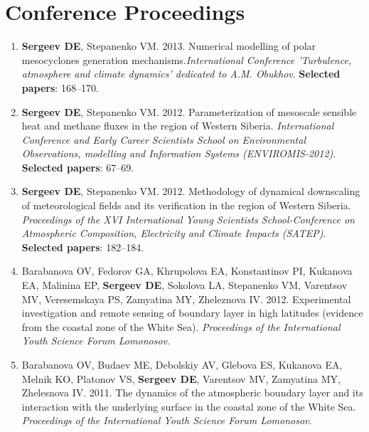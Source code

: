 \documentclass[a4paper,11pt]{article}
\makeatletter
\newlength{\bibhang}
\newlength{\bibsep}
 {\@listi \global\bibsep\itemsep \global\advance\bibsep by\parsep}
\newenvironment{bibsection}%
        {\begin{enumerate}{}{%
       \setlength{\leftmargin}{\bibhang}%
       \setlength{\itemindent}{-\leftmargin}%
       \setlength{\itemsep}{\bibsep}%
       \setlength{\parsep}{\z@}%
        \setlength{\partopsep}{0pt}%
        \setlength{\topsep}{0pt}}}
        {\end{enumerate}\vspace{-.6\baselineskip}}
\makeatother
\begin{document}
\section{Conference Proceedings}
\begin{bibsection}
    \item {\bf Sergeev DE}, Stepanenko VM. 2013. Numerical modelling of polar mesocyclones generation mechanisms.\emph{International Conference 'Turbulence, atmosphere and climate dynamics' dedicated to A.M. Obukhov}. {\bf Selected papers}: 168--170.
    \item {\bf Sergeev DE}, Stepanenko VM. 2012. Parameterization of mesoscale sensible heat and methane fluxes in the region of Western Siberia. \emph{International Conference and Early Career Scientists School on Environmental Observations, modelling and Information Systems (ENVIROMIS-2012)}. {\bf Selected papers}: 67--69.
    \item {\bf Sergeev DE}, Stepanenko VM. 2012. Methodology of dynamical downscaling of meteorological fields and its verification in the region of Western Siberia. \emph{Proceedings of the XVI International Young Scientists School-Conference on Atmospheric Composition, Electricity and Climate Impacts (SATEP)}. {\bf Selected papers}: 182--184.
    \item Barabanova OV, Fedorov GA, Khrupolova EA, Konstantinov PI, Kukanova EA, Malinina EP, {\bf Sergeev DE}, Sokolova LA, Stepanenko VM, Varentsov MV, Veresemskaya PS, Zamyatina MY, Zheleznova IV. 2012. Experimental investigation and remote sensing of boundary layer in high latitudes (evidence from the coastal zone of the White Sea). \emph{Proceedings of the International Youth Science Forum Lomonosov}.
    \item Barabanova OV, Budaev ME, Debolskiy AV, Glebova ES, Kukanova EA, Melnik KO, Platonov VS,  {\bf Sergeev DE}, Varentsov MV, Zamyatina MY, Zhelesnova IV. 2011. The dynamics of the atmospheric boundary layer and its interaction with the underlying surface in the coastal zone of the White Sea. \emph{Proceedings of the International Youth Science Forum Lomonosov}.
\end{bibsection}
\end{document}
